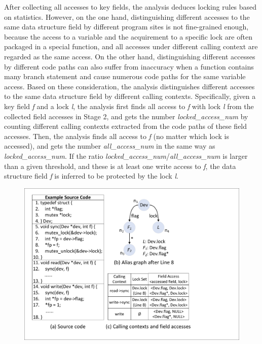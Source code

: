  After collecting all accesses to key fields, 
the analysis deduces locking rules based on statistics. However, on the one 
hand, distinguishing different accesses to the same data structure field by 
different program sites is not fine-grained enough, because the access to a 
variable and the acquirement to a specific lock are often packaged in a special 
function, and all accesses under different calling context are regarded as the 
same access. On the other hand, distinguishing different accesses by different 
code paths can also suffer from inaccuracy when a function contains many branch 
statement and cause numerous code paths for the same variable access. Based on 
these consideration, the analysis distinguishes different accesses to the same 
data structure field by different calling contexts. Specifically, given a key 
field {\em f} and a lock {\em l}, the analysis first finds all access to {\em 
f} with lock {\em l} from the collected field accesses in Stage 2, and gets the 
number {\em locked\_access\_num} by counting different calling contexts 
extracted from the code paths of these field accesses. Then, the analysis finds 
all access to {\em f} (no matter which lock is accessed), and gets the number 
{\em all\_access\_num} in the same way as {\em locked\_access\_num}. If the 
ratio {\em locked\_access\_num}/{\em all\_access\_num} is larger than a given 
threshold, and these is at least one write access to {\em f}, the data 
structure field {\em f} is inferred to be protected by the lock {\em l}.

\begin{figure}[htbp]
	\centering
	\includegraphics[width=1\linewidth]{figures/fig_demo_rule_mining.pdf}
	\label{fig_demo_rule_mining}
\end{figure}

